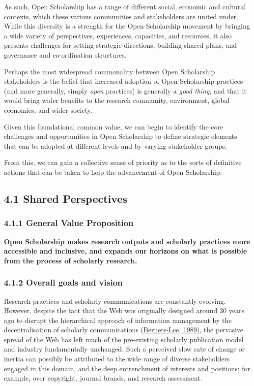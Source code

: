 As such, Open Scholarship has a range of different social, economic and
cultural contexts, which these various communities and stakeholders are
united under. While this diversity is a strength for the Open
Scholarship movement by bringing a wide variety of perspectives,
experiences, capacities, and resources, it also presents challenges for
setting strategic directions, building shared plans, and governance and
co-ordination structures.

Perhaps the most widespread commonality between Open Scholarship
stakeholders is the belief that increased adoption of Open Scholarship
practices (and more generally, simply \emph{open} practices) is
generally a \emph{good thing}, and that it would bring wider benefits to
the research community, environment, global economies, and wider
society.

Given this foundational common value, we can begin to identify the core
challenges and opportunities in Open Scholarship to define strategic
elements that can be adopted at different levels and by varying
stakeholder groups.

From this, we can gain a collective sense of priority as to the sorts of
definitive actions that can be taken to help the advancement of Open
Scholarship.

\subsection{4.1 Shared Perspectives}\label{shared-perspectives}

\subsubsection{4.1.1 General Value
Proposition}\label{general-value-proposition}

\textbf{Open Scholarship makes research outputs and scholarly practices
more accessible and inclusive, and expands our horizons on what is
possible from the process of scholarly research.}

\subsubsection{4.1.2 Overall goals and
vision}\label{overall-goals-and-vision}

Research practices and scholarly communications are constantly evolving.
However, despite the fact that the Web was originally designed around 30
years ago to disrupt the hierarchical approach of information management
by the decentralisation of scholarly communications
(\href{https://www.w3.org/History/1989/proposal.html}{Berners-Lee,
1989}), the pervasive spread of the Web has left much of the
pre-existing scholarly publication model and industry fundamentally
unchanged. Such a perceived slow rate of change or inertia can possibly
be attributed to the wide range of diverse stakeholders engaged in this
domain, and the deep entrenchment of interests and positions; for
example, over copyright, journal brands, and research assessment.

